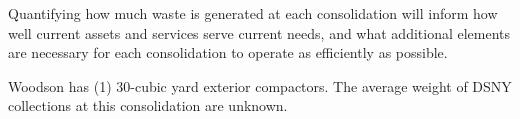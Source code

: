 
    Quantifying how much waste is generated at each consolidation will inform how well current assets and services serve current needs, and what additional elements are necessary for each consolidation to operate as efficiently as possible.
    
    Woodson has (1) 30-cubic yard exterior compactors. The average weight of DSNY collections at this consolidation are unknown.